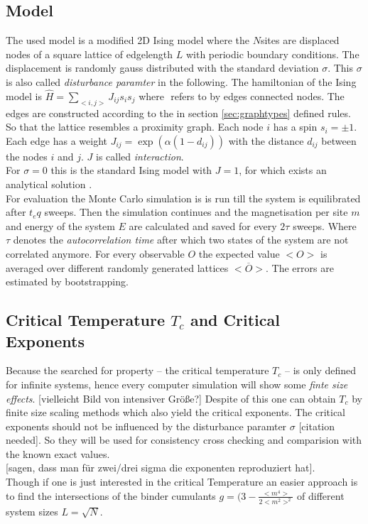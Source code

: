 \subsection{Model}
    The used model is a modified 2D Ising model where the \(N\)sites are
    displaced nodes of a square lattice of edgelength \(L\) with
    periodic boundary conditions. The displacement is randomly gauss
    distributed with the standard deviation \(\sigma\). This \(\sigma\)
    is also called \emph{disturbance paramter} in the following.
    The hamiltonian of the Ising model is
    \(\hat{H} = \sum_{<i,j>}J_{ij}s_{i}s_{j}\)
    where \(<i,j>\) refers to by edges connected nodes.
    The edges are constructed according to the in section
    \ref{sec:graphtypes} defined rules. So that the lattice resembles a
    proximity graph. Each node \(i\) has a spin \(s_i = \pm 1\). Each
    edge has a weight \(J_{ij} = \exp (\alpha (1-d_{ij}))\) with the
    distance \(d_{ij}\) between the nodes \(i\) and \(j\). \(J\) is
    called \emph{interaction}.\\
    For \(\sigma = 0\) this is the standard Ising model with \(J = 1\),
    for which exists an analytical solution \cite{Onsager1944}.\\

    For evaluation the Monte Carlo simulation is is run till the system
    is equilibrated after \(t_eq\) sweeps. Then the simulation continues
    and the magnetisation per site \(m\) and energy of the system \(E\)
    are calculated and saved for every \(2\tau\) sweeps. Where \(\tau\)
    denotes the \emph{autocorrelation time} after which two states of
    the system are not correlated anymore.
    For every observable \(O\) the expected value \(<O>\) is averaged
    over different randomly generated lattices \(\overline{<O>}\). The
    errors are estimated by bootstrapping.

\subsection{Critical Temperature $T_c$ and Critical Exponents}
    Because the searched for property -- the critical temperature \(T_c\)
    -- is only defined for infinite systems, hence every computer
    simulation will show some \emph{finte size effects}.
    [vielleicht Bild von intensiver Größe?]
    Despite of this one can obtain \(T_c\) by finite size scaling
    methods \cite[S. ??]{Newman1998} which also yield the critical
    exponents. The critical exponents should not be influenced by the
    disturbance paramter \(\sigma\) [citation needed]. So they will be
    used for consistency cross checking and comparision with the known
    exact values.\\
    [weiter ausarbeiten] [sagen, dass man für zwei/drei sigma
    die exponenten reproduziert hat].\\
    Though if one is just interested in the critical Temperature an
    easier approach is to find the intersections of the binder cumulants
    \(g = (3-\frac{<m^4>}{2<m^2>^2}\) \cite{Binder1981} of different
    system sizes \(L=\sqrt N\).\\
